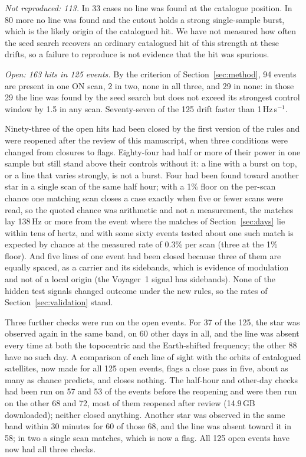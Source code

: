 \documentclass[twocolumn]{aastex631}
\newcommand{\hzs}{Hz\,s$^{-1}$}
\begin{document}
\emph{Not reproduced: 113.} In 33 cases no line was found at the catalogue
position. In 80 more no line was found and the cutout holds a strong
single-sample burst, which is the likely origin of the catalogued hit. We
have not measured how often the seed search recovers an ordinary catalogued
hit of this strength at these drifts, so a failure to reproduce is not
evidence that the hit was spurious.

\emph{Open: 163 hits in 125 events.} By the criterion of
Section~\ref{sec:method}, 94 events are present in one ON scan, 2 in two,
none in all three, and 29 in none: in those 29 the line was found by the
seed search but does not exceed its strongest control window by 1.5 in any
scan. Seventy-seven of the 125 drift faster than 1\,\hzs.

Ninety-three of the open hits had been closed by the first version of the
rules and were reopened after the review of this manuscript, when three
conditions were changed from closures to flags. Eighty-four had half or
more of their power in one sample but still stand above their controls
without it: a line with a burst on top, or a line that varies strongly, is
not a burst. Four had been found toward another star in a single scan of
the same half hour; with a 1\% floor on the per-scan chance one matching
scan closes a case exactly when five or fewer scans were read, so the
quoted chance was arithmetic and not a measurement, the matches lay 138\,Hz
or more from the event where the matches of Section~\ref{sec:days} lie
within tens of hertz, and with some sixty events tested about one such
match is expected by chance at the measured rate of 0.3\% per scan (three
at the 1\% floor). And five lines of one event had been closed
because three of them are equally spaced, as a carrier and its sidebands,
which is evidence of modulation and not of a local origin (the Voyager~1
signal has sidebands). None of the hidden test signals changed outcome
under the new rules, so the rates of Section~\ref{sec:validation} stand.

Three further checks were run on the open events. For 37 of the 125, the
star was observed again in the same band, on 60 other days in all, and the
line was absent every time at both the topocentric and the Earth-shifted
frequency; the other 88 have no such day. A comparison of each
line of sight with the orbits of catalogued satellites, now made for all
125 open events, flags a close pass in five, about as many as chance
predicts, and closes nothing. The half-hour and other-day checks had been
run on 57 and 53 of the events before the reopening and were then run on
the other 68 and 72, most of them reopened after review (14.9\,GB
downloaded); neither closed anything. Another star was observed in the same
band within 30 minutes for 60 of those 68, and the line was absent toward it
in 58; in two a single scan matches, which is now a flag. All 125 open
events have now had all three checks.
\end{document}

